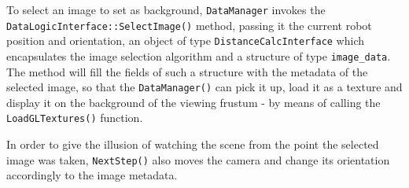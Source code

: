 %
To select an image to set as background, \texttt{DataManager} 
invokes the \\
\texttt{DataLogicInterface::SelectImage()} method, 
passing it the current robot position and orientation, 
an object of type \texttt{DistanceCalcInterface} which 
encapsulates the image selection algorithm and a structure 
of type \texttt{image\_data}.
%
The method will fill the fields of such a structure with 
the metadata of the selected image, so that the 
\texttt{DataManager()} can pick it up, load it as a 
texture and display it on the background of the 
viewing frustum - by means of calling the 
\texttt{LoadGLTextures()} function.
%

%
In order to give the illusion of watching the scene 
from the point the selected image was taken, 
\texttt{NextStep()} also moves the camera and change 
its orientation accordingly to the image metadata.
%
%



